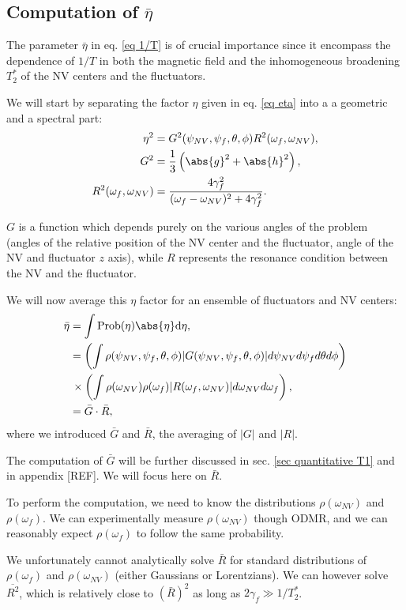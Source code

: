 \documentclass[a4paper,11pt]{report}
\begin{document}
\subsection{Computation of $\bar \eta$}
\label{sec computation eta}
The parameter $\bar \eta$ in eq. \ref{eq 1/T} is of crucial importance since it encompass the dependence of $1/T$ in both the magnetic field and the inhomogeneous broadening $T_2^*$ of the NV centers and the fluctuators.

We will start by separating the factor $\eta$ given in eq. \ref{eq eta} into a a geometric and a spectral part:
\begin{align}
\eta^2&=G^2(\psi_{NV},\psi_f,\theta,\phi) R^2(\omega_f,\omega_{NV}), \\
G^2&=\frac{1}{3}\left(\abs{g}^2+\abs{h}^2 \right),  \\ 
R^2(\omega_f,\omega_{NV}) &= \frac{4\gamma_f^2}{(\omega_f - \omega_{NV})^2+4\gamma_f^2}.
\end{align}

$G$ is a function which depends purely on the various angles of the problem (angles of the relative position of the NV center and the fluctuator, angle of the NV and fluctuator $z$ axis), while $R$ represents the resonance condition between the NV and the fluctuator.

We will now average this $\eta$ factor for an ensemble of fluctuators and NV centers:
\begin{align*}
\bar \eta &= \int \rm{Prob}(\eta) \abs{\eta} d\eta, \\
&= \left(\int \rho(\psi_{NV},\psi_f,\theta,\phi) |G(\psi_{NV},\psi_f,\theta,\phi)| d\psi_{NV} d\psi_f d\theta d\phi \right) \\
&\, \times \left( \int \rho(\omega_{NV}) \rho(\omega_{f}) |R(\omega_f,\omega_{NV})| d\omega_{NV} d\omega_{f} \right), \\
&= \bar G \cdot \bar R,
\end{align*}
where we introduced $\bar G$ and $\bar R$, the averaging of $|G|$ and $|R|$.

The computation of $\bar G$ will be further discussed in sec. \ref{sec quantitative T1} and in appendix [REF]. We will focus here on $\bar R$.

To perform the computation, we need to know the distributions $\rho(\omega_{NV})$ and $\rho(\omega_{f})$. We can experimentally measure $\rho(\omega_{NV})$ though ODMR, and we can reasonably expect $\rho(\omega_{f})$ to follow the same probability.

We unfortunately cannot analytically solve $\bar R$ for standard distributions of $\rho(\omega_{f})$ and $\rho(\omega_{NV})$ (either Gaussians or Lorentzians). We can however solve $\overline{R^2}$, which is relatively close to $(\bar{R})^2$ as long as $2 \gamma_f \gg 1/T_2^*$.
\end{document}
